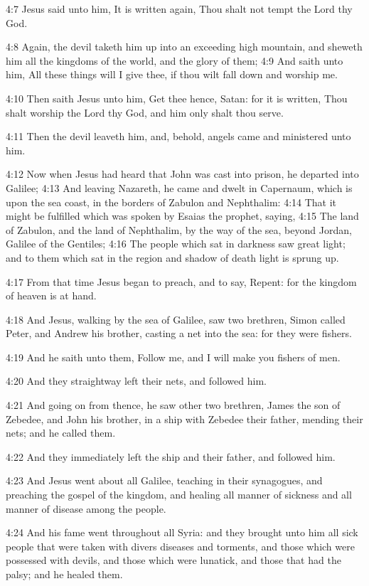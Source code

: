 4:7 Jesus said unto him, It is written again, Thou shalt not tempt the
Lord thy God.

4:8 Again, the devil taketh him up into an exceeding high mountain,
and sheweth him all the kingdoms of the world, and the glory of them;
4:9 And saith unto him, All these things will I give thee, if thou
wilt fall down and worship me.

4:10 Then saith Jesus unto him, Get thee hence, Satan: for it is
written, Thou shalt worship the Lord thy God, and him only shalt thou
serve.

4:11 Then the devil leaveth him, and, behold, angels came and
ministered unto him.

4:12 Now when Jesus had heard that John was cast into prison, he
departed into Galilee; 4:13 And leaving Nazareth, he came and dwelt in
Capernaum, which is upon the sea coast, in the borders of Zabulon and
Nephthalim: 4:14 That it might be fulfilled which was spoken by Esaias
the prophet, saying, 4:15 The land of Zabulon, and the land of
Nephthalim, by the way of the sea, beyond Jordan, Galilee of the
Gentiles; 4:16 The people which sat in darkness saw great light; and
to them which sat in the region and shadow of death light is sprung
up.

4:17 From that time Jesus began to preach, and to say, Repent: for the
kingdom of heaven is at hand.

4:18 And Jesus, walking by the sea of Galilee, saw two brethren, Simon
called Peter, and Andrew his brother, casting a net into the sea: for
they were fishers.

4:19 And he saith unto them, Follow me, and I will make you fishers of
men.

4:20 And they straightway left their nets, and followed him.

4:21 And going on from thence, he saw other two brethren, James the
son of Zebedee, and John his brother, in a ship with Zebedee their
father, mending their nets; and he called them.

4:22 And they immediately left the ship and their father, and followed
him.

4:23 And Jesus went about all Galilee, teaching in their synagogues,
and preaching the gospel of the kingdom, and healing all manner of
sickness and all manner of disease among the people.

4:24 And his fame went throughout all Syria: and they brought unto him
all sick people that were taken with divers diseases and torments, and
those which were possessed with devils, and those which were lunatick,
and those that had the palsy; and he healed them.

